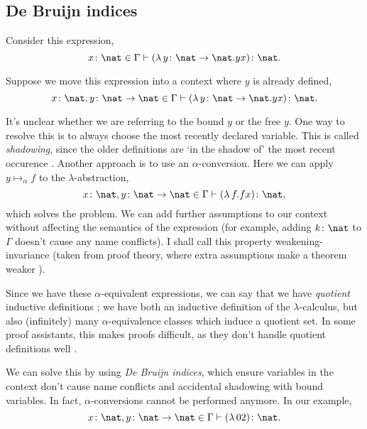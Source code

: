 
\subsection{De Bruijn indices}
\label{section:background_debruijn}
Consider this expression,
\begin{equation*}
  x \colon \nat \in \Gamma \vdash (\lambda \, y \colon \nat \to \nat. y x) \colon \nat.
\end{equation*}

Suppose we move this expression into a context where $y$ is already defined,
\begin{equation*}
  x \colon \nat, y \colon \nat \to \nat \in \Gamma \vdash (\lambda \, y \colon \nat \to \nat. y x) \colon \nat.
\end{equation*}

It's unclear whether we are referring to the bound $y$ or the free $y$. One way to resolve this is
to always choose the most recently declared variable. This is called \textit{shadowing}, since the
older definitions are `in the shadow of' the most recent occurence \citep{wadler_programming_2022}.
Another approach is to use an $\alpha$-conversion. Here we can apply $y \mapsto_{\alpha} f$ to the
$\lambda$-abstraction,
\begin{equation*}
  x \colon \nat, y \colon \nat \to \nat \in \Gamma \vdash (\lambda \, f. f x) \colon \nat,
\end{equation*}
which solves the problem. We can add further assumptions to our context without affecting the
semantics of the expression \citep{pitts_locally_2023} (for example, adding $k \colon \nat$ to
$\Gamma$ doesn't cause any name conflicts). I shall call this property weakening-invariance (taken
from proof theory, where extra assumptions make a theorem weaker \citep{buss_handbook_1998}).

Since we have these $\alpha$-equivalent expressions, we can say that we have \textit{quotient}
inductive definitions \citep{aydemir_engineering_2008}; we have both an inductive definition of the
$\lambda$-calculus, but also (infinitely) many $\alpha$-equivalence classes which induce a quotient
set. In some proof assistants, this makes proofs difficult, as they don't handle quotient
definitions well \citep{pitts_locally_2023}.

We can solve this by using \textit{De Bruijn indices}, which ensure variables in the context don't
cause name conflicts and accidental shadowing with bound variables. In fact, $\alpha$-conversions
cannot be performed anymore. In our example,
\begin{equation*}
  x \colon \nat, y \colon \nat \to \nat \in \Gamma \vdash (\lambda \, 0 2) \colon \nat.
\end{equation*}


